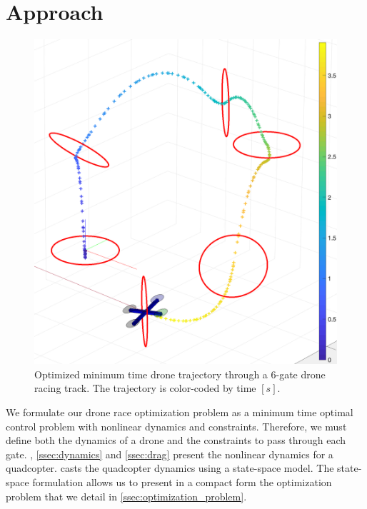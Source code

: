 
\section{Approach}
\label{sec:mathematical_formulation}

\begin{figure}[tbp]
  \centering
  \includegraphics[width=\linewidth]{img/DroneRaceTrajectoryOpt.png}
  \caption{Optimized minimum time drone trajectory through a 6-gate drone racing track. The trajectory is color-coded by time $[s]$.}
  \label{fig:optimized_trajectory}
\end{figure}

We formulate our drone race optimization problem as a minimum time optimal control problem with nonlinear dynamics and constraints.
Therefore, we must define both the dynamics of a drone and the constraints to pass through each gate.
, \ref{ssec:dynamics} and \ref{ssec:drag} present the nonlinear dynamics for a quadcopter.
 casts the quadcopter dynamics using a state-space model.
The state-space formulation allows us to present in a compact form the optimization problem that we detail in \cref{ssec:optimization_problem}.

